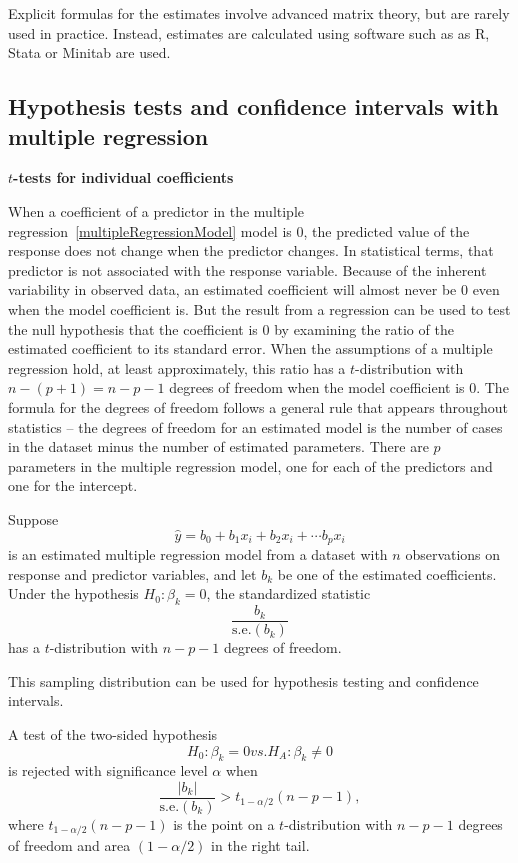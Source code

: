 Explicit formulas for the estimates involve advanced matrix theory, but are rarely used in practice.  Instead, estimates are calculated using software such as as \textsf{R}, Stata or Minitab are used.

\subsection{Hypothesis tests and confidence intervals with multiple regression}

\textbf{$t$-tests for individual coefficients}

When a coefficient of a predictor in the multiple regression~\ref{multipleRegressionModel} model is 0, the predicted value of the response does not change when the predictor changes.  In statistical terms, that predictor is not associated with the response variable.  Because of the inherent variability in observed data, an estimated coefficient will almost never be 0 even when the model coefficient is.  But the result from a regression can be used to test the null hypothesis that the coefficient is 0 by examining the ratio of the estimated coefficient to its standard error.  When the assumptions of a multiple regression hold, at least approximately, this ratio has a $t$-distribution with $n - (p + 1) =n - p - 1$ degrees of freedom when the model coefficient is 0. The formula for the degrees of freedom follows a general rule that appears throughout statistics -- the degrees of freedom for an estimated model is the number of cases in the dataset minus the number of estimated parameters.  There are $p$ parameters in the multiple regression model, one for each of the predictors and one for the intercept.

\begin{termBox}{
Suppose 
\[
\hat{y} = b_0 + b_1 x_{i} + b_2 x_{i} +\cdots b_p x_{i}
\]
is an estimated multiple regression model from a dataset with $n$ observations on response and predictor variables, and let $b_k$ be one of the estimated coefficients.  Under the hypothesis $H_0: \beta_k = 0$, the standardized statistic
\[
      \frac{b_k}{\textrm{s.e.}(b_k)}
\]
has a $t$-distribution with $n - p - 1$ degrees of freedom.}
\end{termBox}

This sampling distribution can be used for hypothesis testing and confidence intervals.

\begin{termBox}{
A test of the two-sided hypothesis
\[
   H_0: \beta_k = 0 vs. H_A: \beta_k \ne 0
\]
is rejected with significance level $\alpha$ when 
\[
     \frac{|b_k|}{\textrm{s.e.}(b_k)} > t_{1 - \alpha/2}(n - p - 1),
\]
where $t_{1 - \alpha/2}(n - p - 1)$ is the point on a $t$-distribution with $n - p - 1$ degrees of freedom and area $(1 - \alpha/2)$ in the right tail.}
\end{termBox}

